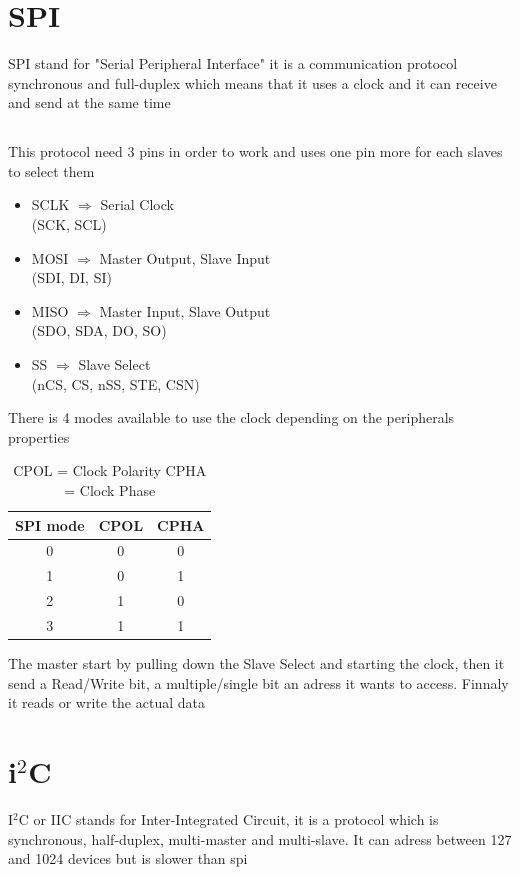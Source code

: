 \documentclass[
10pt,
a4paper,
]{article}
\begin{document}
\section{SPI}
SPI stand for "Serial Peripheral Interface" it is a communication protocol synchronous and full-duplex which means that it uses a clock and it can receive and send at the same time\\
\subsection{}
This protocol need 3 pins in order to work and uses one pin more for each slaves to select them 
\begin{itemize}
	\item SCLK $\Rightarrow$ Serial Clock\\
	      (SCK, SCL)
	\item MOSI $\Rightarrow$ Master Output, Slave Input\\
	      (SDI, DI, SI)
	\item MISO $\Rightarrow$ Master Input, Slave Output\\
	      (SDO, SDA, DO, SO)
	\item SS $\Rightarrow$ Slave Select\\
	      (nCS, CS, nSS, STE, CSN)
\end{itemize}
There is 4 modes available to use the clock depending on the peripherals properties\\
\begin{table}[!hbt]
	\begin{center}
		\begin{tabular}{|c|c|c|}\hline
			SPI mode & CPOL & CPHA \\\hline\hline
			0        & 0    & 0    \\\hline
			1        & 0    & 1    \\\hline
			2        & 1    & 0    \\\hline
			3        & 1    & 1    \\\hline
		\end{tabular}
	\end{center}
	\caption{CPOL = Clock Polarity CPHA = Clock Phase}
\end{table}

The master start by pulling down the Slave Select and starting the clock, then it send a Read/Write bit, a multiple/single bit an adress it wants to access. Finnaly it reads or write the actual data


\section{\texorpdfstring{i$^{2}$C}{}}
I$^2$C or IIC stands for Inter-Integrated Circuit, it is a protocol which is synchronous, half-duplex, multi-master and multi-slave. It can adress between 127 and 1024 devices but is slower than spi
\end{document}
